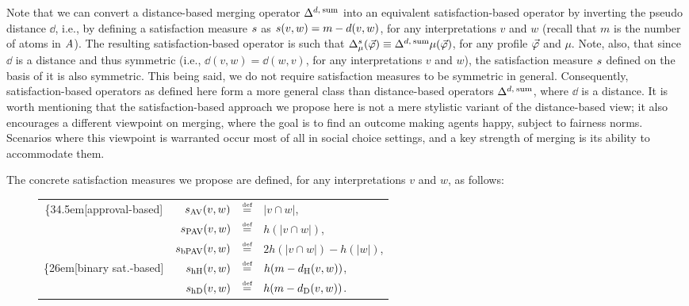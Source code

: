 Note that we can convert a distance-based merging operator $\me^{\dd,\:\ssum}{}$
into an equivalent satisfaction-based operator by inverting the pseudo distance $\dd$, 
i.e., by defining a satisfaction measure $\sat$ as $\sat(v,w)=m-\dd(v,w)$, for any interpretations $v$ and $w$
(recall that $m$ is the number of atoms in $\Atoms$). 
The resulting satisfaction-based operator is such that $\me^\sat_\mu(\P)\equiv\me^{\dd,\:\ssum}{\mu}(\P)$,
for any profile $\P$ and $\mu$.
Note, also, that since $\dd$ is a distance and thus symmetric 
(i.e., $\dd(v,w)=\dd(w,v)$, for any interpretations
$v$ and $w$), the satisfaction measure $\sat$ defined on the basis of it is also symmetric. 
This being said, we do not require satisfaction measures to be symmetric in general. 
Consequently, satisfaction-based operators as defined here form a more general class than 
distance-based operators $\me^{\dd,\:\ssum}$, where $\dd$ is a distance.
It is worth mentioning that the satisfaction-based 
approach we propose here is not a mere stylistic variant
of the distance-based view; 
it also encourages a different viewpoint on merging, where the goal is to find
an outcome making agents happy, subject to fairness norms. 
Scenarios where this viewpoint is warranted 
occur most of all in social choice settings,
and a key strength of merging is its ability to accommodate them.

The concrete satisfaction measures we propose are defined, 
for any interpretations $v$ and $w$,
as follows:
\begin{figure}[h]\centering
	\begin{tabular}{crcl}
		\ldelim\{{3}{4.5em}[\scriptsize approval-based]& 
		$\sat_\av(v,w)$ &$\defeq$& $|v\cap w|$,\\
		&$\sat_\pav(v,w)$ &$\defeq$& $h(|v\cap w|)$,\\
		&$\sat_\bpav(v,w)$ &$\defeq$& $2h(|v\cap w|) - h(|w|)$,\\
		\ldelim\{{2}{6em}[\scriptsize binary sat.-based] 
		&$\sat_\hhamming(v,w)$ &$\defeq$& $h(m-\dd_\hamming(v,w))$,\\
		&$\sat_\hdrastic(v,w)$ &$\defeq$& $h(m-\dd_\drastic(v,w))$.
	\end{tabular}
	\label{tab:5-sat-measures}
\end{figure}

